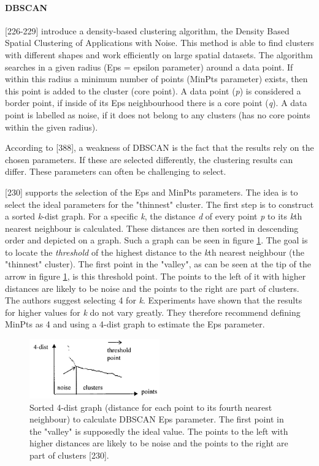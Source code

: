 \paragraph{DBSCAN}
\label{section:DBSCAN}
\textcite{DBSCAN}[226-229] introduce a density-based clustering algorithm, the Density Based Spatial Clustering of Applications with Noise. This method is able to find clusters with different shapes and work efficiently on large spatial datasets. The algorithm searches in a given radius (Eps = epsilon parameter) around a data point. If within this radius a minimum number of points (MinPts parameter) exists, then this point is added to the cluster (core point). A data point (\textit{p}) is considered a border point, if inside of its Eps neighbourhood there is a core point (\textit{q}). A data point is labelled as noise, if it does not belong to any clusters (has no core points within the given radius). 

According to \textcite{han2011data}[388], a weakness of DBSCAN is the fact that the results rely on the chosen parameters. If these are selected differently, the clustering results can differ. These parameters can often be challenging to select.

\textcite{DBSCAN}[230] supports the selection of the Eps and MinPts parameters. The idea is to select the ideal parameters for the "thinnest" cluster. The first step is to construct a sorted \textit{k}-dist graph. For a specific \textit{k}, the distance \textit{d} of every point \textit{p} to its \textit{k}th nearest neighbour is calculated. These distances are then sorted in descending order and depicted on a graph. Such a graph can be seen in figure \ref{figure:sortedKGraphDBSCAN}. The goal is to locate the \textit{threshold} of the highest distance to the \textit{k}th nearest neighbour (the "thinnest" cluster). The first point in the "valley", as can be seen at the tip of the arrow in figure \ref{figure:sortedKGraphDBSCAN}, is this threshold point. The points to the left of it with higher distances are likely to be noise and the points to the right are part of clusters. The authors suggest selecting 4 for \textit{k}. Experiments have shown that the results for higher values for \textit{k} do not vary greatly. They therefore recommend defining MinPts as 4 and using a 4-dist graph to estimate the Eps parameter.


\begin{figure}[h]
  \centering
  \includegraphics[width=0.5\textwidth]{./images/sortedKGraphDBSCAN.png}
  \caption{Sorted 4-dist graph (distance for each point to its fourth nearest neighbour) to calculate DBSCAN Eps parameter. The first point in the "valley" is supposedly the ideal value. The points to the left with higher distances are likely to be noise and the points to the right are part of clusters \autocite{DBSCAN}[230].}
  \label{figure:sortedKGraphDBSCAN}
\end{figure}


